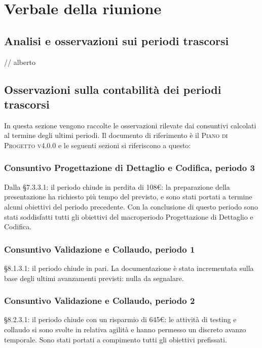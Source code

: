 \section{Verbale della riunione}

\subsection{Analisi e osservazioni sui periodi trascorsi}

// alberto

\subsection{Osservazioni sulla contabilità dei periodi trascorsi}

In questa sezione vengono raccolte le osservazioni rilevate dai consuntivi calcolati al termine degli ultimi periodi. Il documento di riferimento è il \textsc{Piano di Progetto v4.0.0} e le seguenti sezioni si riferiscono a questo:

\subsubsection{Consuntivo Progettazione di Dettaglio e Codifica, periodo 3}

Dalla \S 7.3.3.1: il periodo chiude in perdita di 108\euro: la preparazione della presentazione ha richiesto più tempo del previsto, e sono stati portati a termine alcuni obiettivi del periodo precedente. Con la conclusione di questo periodo sono stati soddisfatti tutti gli obiettivi del macroperiodo Progettazione di Dettaglio e Codifica.

\subsubsection{Consuntivo Validazione e Collaudo, periodo 1}
\S 8.1.3.1: il periodo chiude in pari. La documentazione è stata incrementata sulla base degli ultimi avanzamenti previsti: nulla da segnalare.


\subsubsection{Consuntivo Validazione e Collaudo, periodo 2}

\S 8.2.3.1: il periodo chiude con un risparmio di 645\euro: le attività di testing e collaudo si sono svolte in relativa agilità e hanno permesso un discreto avanzo temporale. Sono stati portati a compimento tutti gli obiettivi prefissati.

